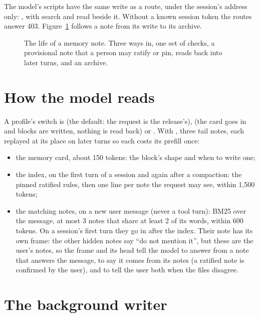 The model's scripts have the same write as a route, under the session's address only: , with search and read beside it. Without a known session token the routes answer 403. Figure~\ref{fig:memory-lifecycle} follows a note from its write to its archive.

\begin{figure}[htbp]
\centering

\caption[The life of a memory note]{The life of a memory note. Three ways in, one set of checks, a provisional note that a person may ratify or pin, reads back into later turns, and an archive.}\label{fig:memory-lifecycle}
\end{figure}

\section{How the model reads}

A profile's  switch is  (the default: the request is the release's),  (the card goes in and blocks are written, nothing is read back) or . With , three tail notes, each replayed at its place on later turns so each costs its prefill once:

\begin{itemize}
\item the memory card, about 150 tokens: the block's shape and when to write one;
\item the index, on the first turn of a session and again after a compaction: the pinned ratified rules, then one line per note the request may see, within 1,500 tokens;
\item the matching notes, on a new user message (never a tool turn): BM25 over the message, at most 3 notes that share at least 2 of its words, within 600 tokens. On a session's first turn they go in after the index. Their note has its own frame: the other hidden notes say ``do not mention it'', but these are the user's notes, so the frame and its head tell the model to answer from a note that answers the message, to say it comes from its notes (a ratified note is confirmed by the user), and to tell the user both when the files disagree.
\end{itemize}

\section{The background writer}

